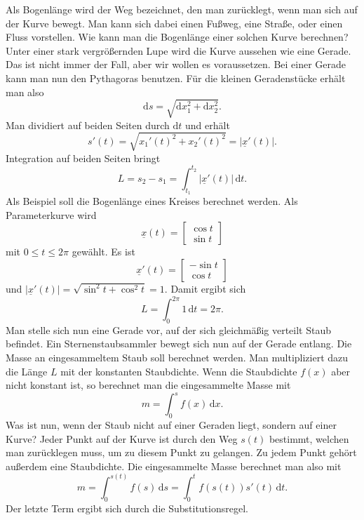 \documentclass[a4paper,10pt,fleqn,twocolumn,twoside]{article}
\numberwithin{equation}{section}
\begin{document}
Als Bogenlänge wird der Weg bezeichnet, den man zurücklegt, wenn
man sich auf der Kurve bewegt. Man kann sich dabei einen Fußweg,
eine Straße, oder einen Fluss vorstellen. Wie kann man die
Bogenlänge einer solchen Kurve berechnen?
Unter einer stark vergrößernden Lupe wird die Kurve aussehen wie
eine Gerade. Das ist nicht immer der Fall, aber wir wollen es
voraussetzen. Bei einer Gerade kann man nun den Pythagoras benutzen.
Für die kleinen Geradenstücke erhält man also
\begin{equation}
\mathrm ds = \sqrt{\mathrm dx_1^2+\mathrm dx_2^2}.
\end{equation}
Man dividiert auf beiden Seiten durch $\mathrm dt$ und erhält
\begin{equation}
s'(t) = \sqrt{x_1'(t)^2+x_2'(t)^2} = |\underline x'(t)|.
\end{equation}
Integration auf beiden Seiten bringt
\begin{equation}
L = s_2-s_1 = \int_{t_1}^{t_2} |\underline x'(t)|\,\mathrm dt.
\end{equation}
%
Als Beispiel soll die Bogenlänge eines Kreises berechnet werden.
Als Parameterkurve wird
\begin{equation}
\underline x(t) = \begin{bmatrix}\cos t\\ \sin t\end{bmatrix}
\end{equation}
mit $0\le t\le 2\pi$ gewählt. Es ist
\begin{equation}
\underline x'(t) = \begin{bmatrix}-\sin t\\ \cos t\end{bmatrix}
\end{equation}
und $|\underline x'(t)|=\sqrt{\sin^2 t+\cos^2 t}=1$.
Damit ergibt sich
\begin{equation}
L = \int_0^{2\pi} 1\,\mathrm dt=2\pi.
\end{equation}
%
Man stelle sich nun eine Gerade vor, auf der sich gleichmäßig
verteilt Staub befindet. Ein Sternenstaubsammler bewegt sich nun auf
der Gerade entlang. Die Masse an eingesammeltem Staub soll
berechnet werden. Man multipliziert dazu die Länge $L$ mit der
konstanten Staubdichte. Wenn die Staubdichte $f(x)$ aber nicht
konstant ist, so berechnet man die eingesammelte Masse mit
\begin{equation}
m = \int_0^s f(x)\,\mathrm dx.
\end{equation}
%
Was ist nun, wenn der Staub nicht auf einer Geraden liegt, sondern auf
einer Kurve? Jeder Punkt auf der Kurve ist durch den Weg $s(t)$
bestimmt, welchen man zurücklegen muss, um zu diesem Punkt zu
gelangen. Zu jedem Punkt gehört außerdem eine Staubdichte. Die
eingesammelte Masse berechnet man also mit
\begin{equation}
m = \int_0^{s(t)} f(s)\,\mathrm ds
= \int_0^t f(s(t))s'(t)\,\mathrm dt.
\end{equation}
Der letzte Term ergibt sich durch die Substitutionsregel.
\end{document}
